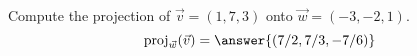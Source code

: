 \begin{problem}
Compute the projection of $\vec{v}=(1,7,3)$ onto $\vec{w}=(-3,-2,1)$.
\[
\textrm{proj}_{\vec{w}}(\vec{v}) = \answer{(7/2,7/3,-7/6)}
\]
\end{problem}